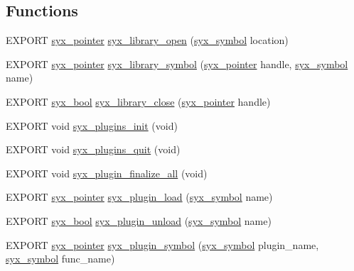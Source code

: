 \subsection*{Functions}
\begin{CompactItemize}
\item 
EXPORT \hyperlink{syx-types_8h_51c518ab1f082eb4330ca143afb1584f}{syx\_\-pointer} \hyperlink{syx-plugins_8h_6b48deab36f556a73b02453cf5ed9b6e}{syx\_\-library\_\-open} (\hyperlink{syx-types_8h_9663af54b7b72f5d8be5f754ef356525}{syx\_\-symbol} location)
\item 
EXPORT \hyperlink{syx-types_8h_51c518ab1f082eb4330ca143afb1584f}{syx\_\-pointer} \hyperlink{syx-plugins_8h_ed01df39e96e573f7b504c4dafd8126a}{syx\_\-library\_\-symbol} (\hyperlink{syx-types_8h_51c518ab1f082eb4330ca143afb1584f}{syx\_\-pointer} handle, \hyperlink{syx-types_8h_9663af54b7b72f5d8be5f754ef356525}{syx\_\-symbol} name)
\item 
EXPORT \hyperlink{syx-types_8h_c6dc09b276b99fa1956364359139daab}{syx\_\-bool} \hyperlink{syx-plugins_8h_2a3ccc043c4868935df503cac3dba4fe}{syx\_\-library\_\-close} (\hyperlink{syx-types_8h_51c518ab1f082eb4330ca143afb1584f}{syx\_\-pointer} handle)
\item 
EXPORT void \hyperlink{syx-plugins_8h_7abf4245abf9341dc6caca814ab9b43a}{syx\_\-plugins\_\-init} (void)
\item 
EXPORT void \hyperlink{syx-plugins_8h_ea277a3b110086b42fbc7ff3fe9fd535}{syx\_\-plugins\_\-quit} (void)
\item 
EXPORT void \hyperlink{syx-plugins_8h_254fac7eb85ca2c9c2d5158237afb585}{syx\_\-plugin\_\-finalize\_\-all} (void)
\item 
EXPORT \hyperlink{syx-types_8h_51c518ab1f082eb4330ca143afb1584f}{syx\_\-pointer} \hyperlink{syx-plugins_8h_6bbfab98888c3c4094f8c686971df84f}{syx\_\-plugin\_\-load} (\hyperlink{syx-types_8h_9663af54b7b72f5d8be5f754ef356525}{syx\_\-symbol} name)
\item 
EXPORT \hyperlink{syx-types_8h_c6dc09b276b99fa1956364359139daab}{syx\_\-bool} \hyperlink{syx-plugins_8h_de5e4570fa91b561d987fcd4d95d4bc2}{syx\_\-plugin\_\-unload} (\hyperlink{syx-types_8h_9663af54b7b72f5d8be5f754ef356525}{syx\_\-symbol} name)
\item 
EXPORT \hyperlink{syx-types_8h_51c518ab1f082eb4330ca143afb1584f}{syx\_\-pointer} \hyperlink{syx-plugins_8h_5b073fb9cec1768d2c51bf5b82775da6}{syx\_\-plugin\_\-symbol} (\hyperlink{syx-types_8h_9663af54b7b72f5d8be5f754ef356525}{syx\_\-symbol} plugin\_\-name, \hyperlink{syx-types_8h_9663af54b7b72f5d8be5f754ef356525}{syx\_\-symbol} func\_\-name)

\end{CompactItemize}
